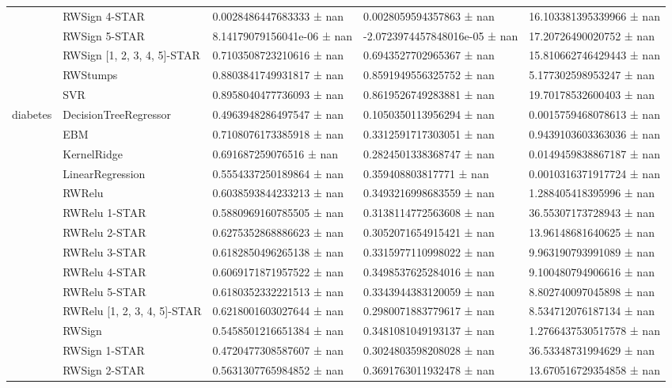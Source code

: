 \begin{tabular}{lllll}
 & RWSign 4-STAR & 0.0028486447683333 ± nan & 0.0028059594357863 ± nan & 16.103381395339966 ± nan \\
 & RWSign 5-STAR & 8.14179079156041e-06 ± nan & -2.0723974457848016e-05 ± nan & 17.20726490020752 ± nan \\
 & RWSign [1, 2, 3, 4, 5]-STAR & 0.7103508723210616 ± nan & 0.6943527702965367 ± nan & 15.810662746429443 ± nan \\
 & RWStumps & 0.8803841749931817 ± nan & 0.8591949556325752 ± nan & 5.177302598953247 ± nan \\
 & SVR & 0.8958040477736093 ± nan & 0.8619526749283881 ± nan & 19.70178532600403 ± nan \\
\cline{1-5}
\multirow[t]{20}{*}{diabetes} & DecisionTreeRegressor & 0.4963948286497547 ± nan & 0.1050350113956294 ± nan & 0.0015759468078613 ± nan \\
 & EBM & 0.7108076173385918 ± nan & 0.3312591717303051 ± nan & 0.9439103603363036 ± nan \\
 & KernelRidge & 0.691687259076516 ± nan & 0.2824501338368747 ± nan & 0.0149459838867187 ± nan \\
 & LinearRegression & 0.5554337250189864 ± nan & 0.359408803817771 ± nan & 0.0010316371917724 ± nan \\
 & RWRelu & 0.6038593844233213 ± nan & 0.3493216998683559 ± nan & 1.288405418395996 ± nan \\
 & RWRelu 1-STAR & 0.5880969160785505 ± nan & 0.3138114772563608 ± nan & 36.55307173728943 ± nan \\
 & RWRelu 2-STAR & 0.6275352868886623 ± nan & 0.3052071654915421 ± nan & 13.96148681640625 ± nan \\
 & RWRelu 3-STAR & 0.6182850496265138 ± nan & 0.3315977110998022 ± nan & 9.963190793991089 ± nan \\
 & RWRelu 4-STAR & 0.6069171871957522 ± nan & 0.3498537625284016 ± nan & 9.100480794906616 ± nan \\
 & RWRelu 5-STAR & 0.6180352332221513 ± nan & 0.3343944383120059 ± nan & 8.802740097045898 ± nan \\
 & RWRelu [1, 2, 3, 4, 5]-STAR & 0.6218001603027644 ± nan & 0.2980071883779617 ± nan & 8.534712076187134 ± nan \\
 & RWSign & 0.5458501216651384 ± nan & 0.3481081049193137 ± nan & 1.2766437530517578 ± nan \\
 & RWSign 1-STAR & 0.4720477308587607 ± nan & 0.3024803598208028 ± nan & 36.53348731994629 ± nan \\
 & RWSign 2-STAR & 0.5631307765984852 ± nan & 0.3691763011932478 ± nan & 13.670516729354858 ± nan \\

\end{tabular}
